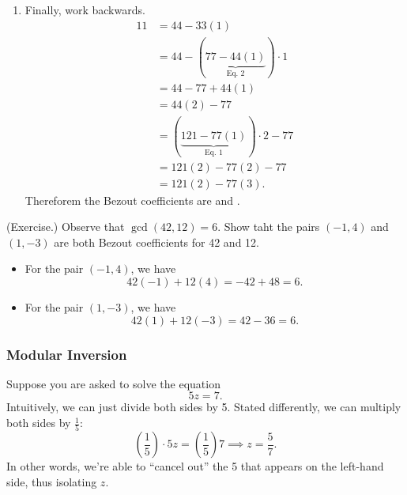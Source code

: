\documentclass[letterpaper]{article}
\begin{document}
\begin{mdframed}
\begin{itemize}
\begin{mdframed}
\begin{enumerate}
                \item Finally, work backwards. 
                \begin{equation*}
                    \begin{aligned}
                        11 &= 44 - 33(1) \\ 
                            &= 44 - (\underbrace{77 - 44(1)}_{\text{Eq. 2}}) \cdot 1 \\
                            &= 44 - 77 + 44(1) \\ 
                            &= 44(2) - 77 \\ 
                            &= (\underbrace{121 - 77(1)}_{\text{Eq. 1}}) \cdot 2 - 77 \\ 
                            &= 121(2) - 77(2) - 77 \\ 
                            &= 121(2) - 77(3).
                    \end{aligned}
                \end{equation*}
                Thereforem the Bezout coefficients are  and .
            \end{enumerate}
        \end{mdframed}
    \end{itemize}
\end{mdframed}

\begin{mdframed}
    (Exercise.) Observe that $\gcd(42, 12) = 6$. Show taht the pairs $(-1, 4)$ and $(1, -3)$ are both Bezout coefficients for 42 and 12. 

    \begin{mdframed}
        \begin{itemize}
            \item For the pair $(-1, 4)$, we have 
            \[42(-1) + 12(4) = -42 + 48 = 6.\]

            \item For the pair $(1, -3)$, we have 
            \[42(1) + 12(-3) = 42 - 36 = 6.\]
        \end{itemize}
    \end{mdframed}
\end{mdframed}


\subsubsection{Modular Inversion}
Suppose you are asked to solve the equation 
\[5z = 7.\]
Intuitively, we can just divide both sides by 5. Stated differently, we can multiply both sides by $\frac{1}{5}$:
\[\left(\frac{1}{5}\right) \cdot 5z = \left(\frac{1}{5}\right) 7 \implies z = \frac{5}{7}.\]
In other words, we're able to ``cancel out'' the 5 that appears on the left-hand side, thus isolating $z$. 
\end{document}
